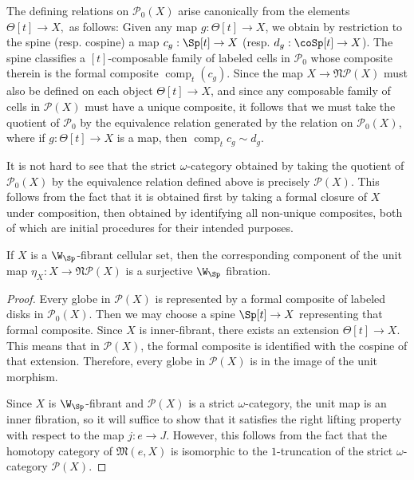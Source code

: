 The defining relations on \(\mathcal{P}_0(X)\) arise canonically from the elements \(\Theta[t]\to X,\) as follows: Given any map \(g:\Theta[t]\to X\), we obtain by restriction to the spine (resp. cospine) a map \(c_g:\Sp[t]\to X\) (resp. \(d_g:\coSp[t]\to X\)).  The spine classifies a \([t]\)-composable family of labeled cells in \(\mathcal{P}_0\) whose composite therein is the formal composite \(\operatorname{comp}_t(c_g)\).  Since the map \(X\to \mathfrak{N}\mathcal{P}(X)\) must also be defined on each object \(\Theta[t]\to X\), and since any composable family of cells in \(\mathcal{P}(X)\) must have a unique composite, it follows that we must take the quotient of \(\mathcal{P}_0\) by the equivalence relation generated by the relation on \(\mathcal{P}_0(X)\), 
where if \(g:\Theta[t]\to X\) is a map, then \(\operatorname{comp}_t c_g \sim d_g\). 

It is not hard to see that the strict \(\omega\)-category  obtained by taking the quotient of \(\mathcal{P}_0(X)\) by the equivalence relation defined above is precisely \(\mathcal{P}(X)\).  This follows from the fact that it is obtained first by taking a formal closure of \(X\) under composition, then obtained by identifying all non-unique composites, both of which are initial procedures for their intended purposes.  

\begin{prop} If \(X\) is a \(\W_{\Sp}\)-fibrant cellular set, then the corresponding component of the unit map \(\eta_X:X\to \mathfrak{N}\mathcal{P}(X)\) is a surjective \(\W_{\Sp}\) fibration. 
\end{prop}
\begin{proof} Every globe in \(\mathcal{P}(X)\) is represented by a formal composite of labeled disks in \(\mathcal{P}_0(X)\).  Then we may choose a spine \(\Sp[t]\to X\) representing that formal composite.  Since \(X\) is inner-fibrant, there exists an extension \(\Theta[t]\to X\).  This means that in \(\mathcal{P}(X)\), the formal composite is identified with the cospine of that extension.  Therefore, every globe in \(\mathcal{P}(X)\) is in the image of the unit morphism.  

Since \(X\) is \(\W_{\Sp}\)-fibrant and \(\mathcal{P}(X)\) is a strict \(\omega\)-category, the unit map is an inner fibration, so it will suffice to show that it satisfies the right lifting property with respect to the map \(j:e\to J\).  However, this follows from the fact that the homotopy category of \(\mathfrak{M}(e,X)\) is isomorphic to the \(1\)-truncation of the strict \(\omega\)-category \(\mathcal{P}(X)\).  
\end{proof}